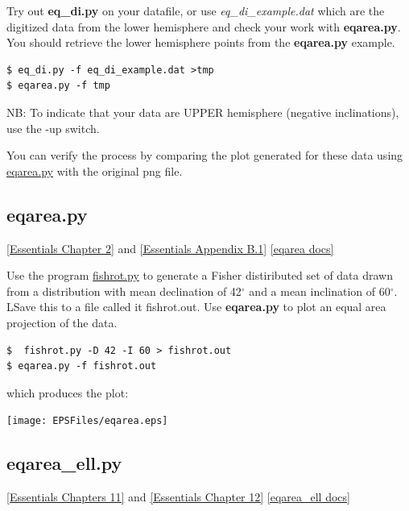 \documentclass[11pt]{book}
\begin{document}
{{{Try out {\bf eq\_di.py} on your datafile, or use {\it eq\_di\_example.dat} which are the digitized data from the lower hemisphere and check your work with {\bf eqarea.py}.  You should retrieve the lower hemisphere points from the {\bf eqarea.py} example.

\begin{verbatim}
$ eq_di.py -f eq_di_example.dat >tmp
$ eqarea.py -f tmp
\end{verbatim}

NB: To indicate that your data are UPPER hemisphere (negative inclinations), use the -up switch.


You can verify the process by comparing the plot generated for these data using \href{#eqarea.py}{eqarea.py} with the original png file.


%
\subsection{eqarea.py}
\href{http://earthref.org/MAGIC/books/Tauxe/Essentials/WebBook3ch2.html#ch2}{ [Essentials Chapter 2]} and
\href{http://earthref.org/MAGIC/books/Tauxe/Essentials/WebBook3ap1.html#Plots_useful_in_paleomagnetism}{[Essentials Appendix B.1]}
\href{https://github.com/PmagPy/PmagPy/blob/master/programs/eqarea.py}{[eqarea docs]}

Use the program \href{#fishrot.py}{fishrot.py} to generate a Fisher distiributed set of data drawn from a distribution with mean declination of 42$^{\circ}$ and a mean inclination of 60$^{\circ}$.  LSave this to a file called {it fishrot.out}.   Use {\bf eqarea.py} to
plot an equal area projection of the data.

\begin{verbatim}
$  fishrot.py -D 42 -I 60 > fishrot.out
$ eqarea.py -f fishrot.out
\end{verbatim}

\noindent
which produces the plot:

\texttt{[image: EPSFiles/eqarea.eps]}

\subsection{eqarea\_ell.py}
\href{http://earthref.org/MAGIC/books/Tauxe/Essentials/WebBook3ch11.html#ch11}{ [Essentials Chapters 11]} and \href{http://earthref.org/MAGIC/books/Tauxe/Essentials/WebBook3ch12.html#ch12}{ [Essentials Chapter 12]}
\href{https://github.com/PmagPy/PmagPy/blob/master/programs/eqarea_ell.py}{[eqarea\_ell docs]}

}}}
\end{document}
